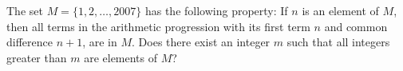 The set $M=\{1,2,\ldots,2007\}$ has the following property: If $n$ is an element of $M$, then all terms in the arithmetic progression with its first term $n$ and common difference $n+1$, are in $M$. Does there exist an integer $m$ such that all integers greater than $m$ are elements of $M$?